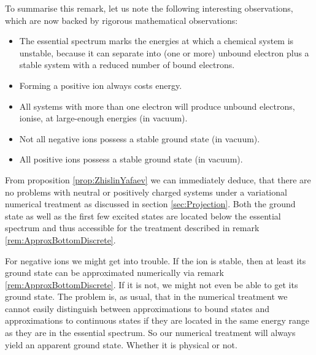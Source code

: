 \begin{rem}
	To summarise this remark, let us note the following
	interesting observations,
	which are now backed by rigorous mathematical observations:
	\begin{itemize}
		\item The essential spectrum marks the energies
			at which a chemical system is unstable,
			because it can separate into (one or more) unbound electron
			plus a stable system with a
			reduced number of bound electrons.
		\item Forming a positive ion always costs energy.
		\item All systems with more than one electron
			will produce unbound electrons,
			\ie ionise, at large-enough energies (in vacuum).
		\item Not all negative ions possess a stable ground state (in vacuum).
		\item All positive ions possess a stable ground state (in vacuum).
	\end{itemize}
\end{rem}

\begin{rem}
	From proposition \ref{prop:ZhislinYafaev}
	we can immediately deduce,
	that there are no problems with neutral or positively charged
	systems under a variational numerical treatment as discussed
	in section \vref{sec:Projection}.
	Both the ground state as well as the first few
	excited states are located below the
	essential spectrum and thus accessible for the treatment
	described in remark \vref{rem:ApproxBottomDiscrete}.

	For negative ions we might get into trouble.
	If the ion is stable,
	then at least its ground state can be approximated
	numerically via remark \ref{rem:ApproxBottomDiscrete}.
	If it is not, we might not even be able to get
	its ground state.
	The problem is, as usual, that in the numerical treatment
	we cannot easily distinguish between approximations
	to bound states and approximations to continuous states
	if they are located in the same energy range
	as they are in the essential spectrum.
	So our numerical treatment will always yield
	an apparent ground state.
	Whether it is physical or not.
\end{rem}
